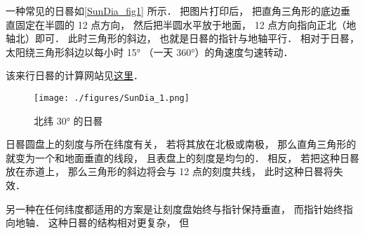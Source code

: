 

一种常见的日晷如\autoref{SunDia_fig1} 所示． 把图片打印后， 把直角三角形的底边垂直固定在半圆的 12 点方向， 然后把半圆水平放于地面， 12 点方向指向正北（地轴北）即可． 此时三角形的斜边， 也就是日晷的指针与地轴平行． 相对于日晷， 太阳绕三角形斜边以每小时 15° （一天 360°）的角速度匀速转动．

该来行日晷的计算网站见\href{https://www.blocklayer.com/sundial.aspx}{这里}．
\begin{figure}[ht]
\centering
\texttt{[image: ./figures/SunDia\_1.png]}
\caption{北纬 30° 的日晷} \label{SunDia_fig1}
\end{figure}

日晷圆盘上的刻度与所在纬度有关， 若将其放在北极或南极， 那么直角三角形的就变为一个和地面垂直的线段， 且表盘上的刻度是均匀的． 相反， 若把这种日晷放在赤道上， 那么三角形的斜边将会与 12 点的刻度共线， 此时这种日晷将失效．

另一种在任何纬度都适用的方案是让刻度盘始终与指针保持垂直， 而指针始终指向地轴． 这种日晷的结构相对更复杂， 但
